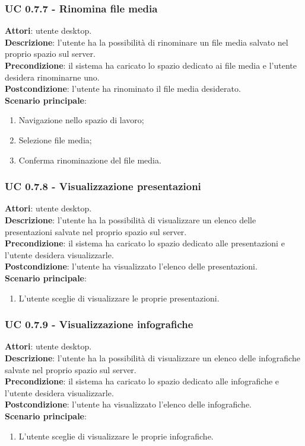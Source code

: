 	\subsubsection{UC 0.7.7 - Rinomina file media}{
		\label{uc0.7.7}
		\textbf{Attori}: utente desktop.	\\
		\textbf{Descrizione}: l'utente ha la possibilità di rinominare un file media salvato nel proprio spazio sul server. \\
		\textbf{Precondizione}: il sistema ha caricato lo spazio dedicato ai file media e l'utente desidera rinominarne uno.	\\
		\textbf{Postcondizione}: l'utente ha rinominato il file media desiderato.	\\
		\textbf{Scenario principale}:
		\begin{enumerate}
			\item Navigazione nello spazio di lavoro;
			\item Selezione file media;
			\item Conferma rinominazione del file media.
		\end{enumerate}
		}
	\subsubsection{UC 0.7.8 - Visualizzazione presentazioni}{
		\label{uc0.7.8}
		\textbf{Attori}: utente desktop.	\\
		\textbf{Descrizione}: l'utente ha la possibilità di visualizzare un elenco delle presentazioni salvate nel proprio spazio sul server. \\
		\textbf{Precondizione}: il sistema ha caricato lo spazio dedicato alle presentazioni e l'utente desidera visualizzarle.	\\
		\textbf{Postcondizione}: l'utente ha visualizzato l'elenco delle presentazioni.	\\
		\textbf{Scenario principale}:
		\begin{enumerate}
			\item L'utente sceglie di visualizzare le proprie presentazioni.
		\end{enumerate}
		}
	\subsubsection{UC 0.7.9 - Visualizzazione infografiche}{
		\label{uc0.7.9}
		\textbf{Attori}: utente desktop.	\\
		\textbf{Descrizione}: l'utente ha la possibilità di visualizzare un elenco delle infografiche salvate nel proprio spazio sul server. \\
		\textbf{Precondizione}: il sistema ha caricato lo spazio dedicato alle infografiche e l'utente desidera visualizzarle.	\\
		\textbf{Postcondizione}: l'utente ha visualizzato l'elenco delle infografiche.	\\
		\textbf{Scenario principale}:
		\begin{enumerate}
			\item L'utente sceglie di visualizzare le proprie infografiche.
		\end{enumerate}
		}
